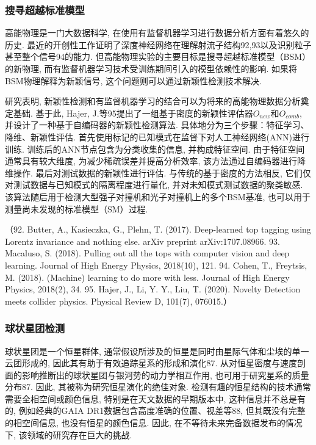 \documentclass{Style/aas}
\begin{document}
\begin{multicols}{2}
\subsubsection{搜寻超越标准模型}
高能物理是一门大数据科学, 在使用有监督机器学习进行数据分析方面有着悠久的历史. 最近的开创性工作证明了深度神经网络在理解射流子结构92,93以及识别粒子甚至整个信号94的能力. 但高能物理实验的主要目标是搜寻超越标准模型（BSM）的新物理, 而有监督机器学习技术受训练期间引入的模型依赖性的影响. 如果将BSM物理解释为新颖信号, 这个问题则可以通过新颖性检测技术解决. 

研究表明, 新颖性检测和有监督机器学习的结合可以为将来的高能物理数据分析奠定基础. 基于此, Hajer, J.等95提出了一组基于密度的新颖性评估器$O_{new}$和$O_{comb}$, 并设计了一种基于自编码器的新颖性检测算法. 具体地分为三个步骤：特征学习、降维、新颖性评估. 首先使用标记的已知模式在监督下对人工神经网络(ANN)进行训练. 训练后的ANN节点包含为分类收集的信息, 并构成特征空间. 由于特征空间通常具有较大维度, 为减少稀疏误差并提高分析效率, 该方法通过自编码器进行降维操作. 最后对测试数据的新颖性进行评估. 与传统的基于密度的方法相反, 它们仅对测试数据与已知模式的隔离程度进行量化, 并对未知模式测试数据的聚类敏感. 该算法随后用于检测大型强子对撞机和光子对撞机上的多个BSM基准, 也可以用于测量尚未发现的标准模型（SM）过程.

（92.	Butter, A., Kasieczka, G., Plehn, T. (2017). Deep-learned top tagging using Lorentz invariance and nothing else. arXiv preprint arXiv:1707.08966.
93.	Macaluso, S. (2018). Pulling out all the tops with computer vision and deep learning. Journal of High Energy Physics, 2018(10), 121.
94.	Cohen, T., Freytsis, M. (2018). (Machine) learning to do more with less. Journal of High Energy Physics, 2018(2), 34.
95.	Hajer, J., Li, Y. Y., Liu, T. (2020). Novelty Detection meets collider physics. Physical Review D, 101(7), 076015.）

\subsubsection{球状星团检测}
球状星团是一个恒星群体, 通常假设所涉及的恒星是同时由星际气体和尘埃的单一云团形成的, 因此其有助于有效追踪星系的形成和演化87. 从对恒星密度与速度剖面的影响推断出的球状星团与银河势的动力学相互作用, 也可用于研究星系的质量分布87. 因此, 其被称为研究恒星演化的绝佳对象. 检测有趣的恒星结构的技术通常需要全相空间或颜色信息, 特别是在天文数据的早期版本中, 这种信息并不总是有的, 例如经典的GAIA DR1数据包含高度准确的位置、视差等88, 但其既没有完整的相空间信息, 也没有恒星的颜色信息. 因此, 在不等待未来完备数据发布的情况下, 该领域的研究存在巨大的挑战. 


\end{multicols}
\end{document}
